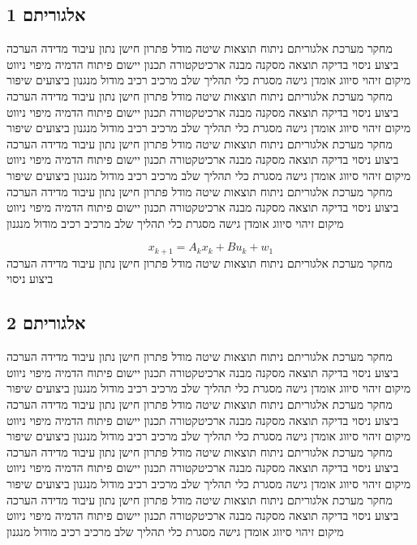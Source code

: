 \subsection{אלגוריתם 1}
\label{sub:ch06_1}
מחקר מערכת אלגוריתם ניתוח תוצאות שיטה מודל פתרון חישן נתון עיבוד מדידה הערכה ביצוע ניסוי בדיקה תוצאה מסקנה מבנה ארכיטקטורה תכנון יישום פיתוח הדמיה מיפוי ניווט מיקום זיהוי סיווג אומדן גישה מסגרת כלי תהליך שלב מרכיב רכיב מודול מנגנון ביצועים שיפור מחקר מערכת אלגוריתם ניתוח תוצאות שיטה מודל פתרון חישן נתון עיבוד מדידה הערכה ביצוע ניסוי בדיקה תוצאה מסקנה מבנה ארכיטקטורה תכנון יישום פיתוח הדמיה מיפוי ניווט מיקום זיהוי סיווג אומדן גישה מסגרת כלי תהליך שלב מרכיב רכיב מודול מנגנון ביצועים שיפור מחקר מערכת אלגוריתם ניתוח תוצאות שיטה מודל פתרון חישן נתון עיבוד מדידה הערכה ביצוע ניסוי בדיקה תוצאה מסקנה מבנה ארכיטקטורה תכנון יישום פיתוח הדמיה מיפוי ניווט מיקום זיהוי סיווג אומדן גישה מסגרת כלי תהליך שלב מרכיב רכיב מודול מנגנון ביצועים שיפור מחקר מערכת אלגוריתם ניתוח תוצאות שיטה מודל פתרון חישן נתון עיבוד מדידה הערכה ביצוע ניסוי בדיקה תוצאה מסקנה מבנה ארכיטקטורה תכנון יישום פיתוח הדמיה מיפוי ניווט מיקום זיהוי סיווג אומדן גישה מסגרת כלי תהליך שלב מרכיב רכיב מודול מנגנון

\begin{equation}
    x_{k+1} = A_{k} x_k + B u_{k} + w_{1}
    \label{eq:ch06_1}
\end{equation}
מחקר מערכת אלגוריתם ניתוח תוצאות שיטה מודל פתרון חישן נתון עיבוד מדידה הערכה ביצוע ניסוי

\subsection{אלגוריתם 2}
\label{sub:ch06_2}
מחקר מערכת אלגוריתם ניתוח תוצאות שיטה מודל פתרון חישן נתון עיבוד מדידה הערכה ביצוע ניסוי בדיקה תוצאה מסקנה מבנה ארכיטקטורה תכנון יישום פיתוח הדמיה מיפוי ניווט מיקום זיהוי סיווג אומדן גישה מסגרת כלי תהליך שלב מרכיב רכיב מודול מנגנון ביצועים שיפור מחקר מערכת אלגוריתם ניתוח תוצאות שיטה מודל פתרון חישן נתון עיבוד מדידה הערכה ביצוע ניסוי בדיקה תוצאה מסקנה מבנה ארכיטקטורה תכנון יישום פיתוח הדמיה מיפוי ניווט מיקום זיהוי סיווג אומדן גישה מסגרת כלי תהליך שלב מרכיב רכיב מודול מנגנון ביצועים שיפור מחקר מערכת אלגוריתם ניתוח תוצאות שיטה מודל פתרון חישן נתון עיבוד מדידה הערכה ביצוע ניסוי בדיקה תוצאה מסקנה מבנה ארכיטקטורה תכנון יישום פיתוח הדמיה מיפוי ניווט מיקום זיהוי סיווג אומדן גישה מסגרת כלי תהליך שלב מרכיב רכיב מודול מנגנון ביצועים שיפור מחקר מערכת אלגוריתם ניתוח תוצאות שיטה מודל פתרון חישן נתון עיבוד מדידה הערכה ביצוע ניסוי בדיקה תוצאה מסקנה מבנה ארכיטקטורה תכנון יישום פיתוח הדמיה מיפוי ניווט מיקום זיהוי סיווג אומדן גישה מסגרת כלי תהליך שלב מרכיב רכיב מודול מנגנון

